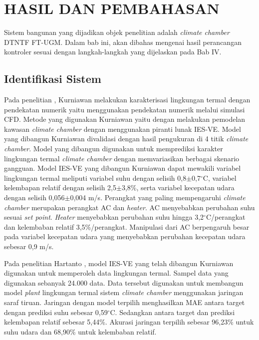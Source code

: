 \chapter{HASIL DAN PEMBAHASAN}
\label{hasil-dan-pembahasan}
Sistem bangunan yang dijadikan objek penelitian adalah \textit{climate chamber} DTNTF FT-UGM. Dalam bab ini, akan dibahas mengenai hasil perancangan kontroler sesuai dengan langkah-langkah yang dijelaskan pada Bab IV.

\section{Identifikasi Sistem}

Pada penelitian \cite{skripsiIchfan}, Kurniawan melakukan karakterisasi lingkungan termal dengan pendekatan numerik yaitu menggunakan pendekatan numerik melalui simulasi CFD. Metode yang digunakan Kurniawan yaitu dengan melakukan pemodelan kawasan \textit{climate chamber} dengan menggunakan piranti lunak IES-VE. Model yang dibangun Kurniawan divalidasi dengan hasil pengukuran di 4 titik \textit{climate chamber}. Model yang dibangun digunakan untuk memprediksi karakter lingkungan termal \textit{climate chamber} dengan memvariasikan berbagai skenario gangguan. Model IES-VE yang dibangun Kurniawan dapat mewakili variabel lingkungan termal meliputi variabel suhu dengan selisih 0,8$\pm$0,7$^\circ$C, variabel kelembapan relatif dengan selisih 2,5$\pm$3,8\%, serta variabel kecepatan udara dengan selisih 0,056$\pm$0,004 m/s. Perangkat yang paling mempengaruhi \textit{climate chamber} merupakan perangkat AC dan \textit{heater}. AC menyebabkan perubahan suhu sesuai \textit{set point}. \textit{Heater} menyebabkan perubahan suhu hingga 3,2$^\circ$C/perangkat dan kelembaban relatif 3,5\%/perangkat. Manipulasi dari AC berpengaruh besar pada variabel kecepatan udara yang menyebabkan perubahan kecepatan udara sebesar 0,9 m/s.

Pada penelitian Hartanto \cite{skripsiTanto}, model IES-VE yang telah dibangun Kurniawan digunakan untuk memperoleh data lingkungan termal. Sampel data yang digunakan sebanyak 24.000 data. Data tersebut digunakan untuk membangun model \textit{plant} lingkungan termal sistem \textit{climate chamber} menggunakan jaringan saraf tiruan. Jaringan dengan model terpilih menghasilkan MAE antara target dengan prediksi suhu sebesar 0,59$^\circ$C. Sedangkan antara target dan prediksi kelembapan relatif sebesar 5,44\%. Akurasi jaringan terpilih sebesar 96,23\% untuk suhu udara dan 68,90\% untuk kelembaban relatif.

